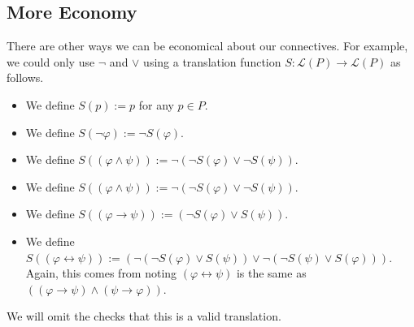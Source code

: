 \subsection{More Economy}
There are other ways we can be economical about our connectives. For example, we could only use $\lnot$ and $\lor$ using a translation function $S:\mathcal L(P)\to\mathcal L(P)$ as follows.
\begin{itemize}
	\item We define $S(p):=p$ for any $p\in P$.
	\item We define $S(\lnot\varphi):=\lnot S(\varphi)$.
	\item We define $S((\varphi\land\psi)):=\lnot(\lnot S(\varphi)\lor\lnot S(\psi))$.
	\item We define $S((\varphi\land\psi)):=\lnot(\lnot S(\varphi)\lor\lnot S(\psi))$.
	\item We define $S((\varphi\to\psi)):=(\lnot S(\varphi)\lor S(\psi))$.
	\item We define $S((\varphi\leftrightarrow\psi)):=(\lnot(\lnot S(\varphi)\lor S(\psi))\lor\lnot(\lnot S(\psi)\lor S(\varphi)))$. Again, this comes from noting $(\varphi\leftrightarrow\psi)$ is the same as $((\varphi\to\psi)\land(\psi\to\varphi))$.
\end{itemize}
We will omit the checks that this is a valid translation.